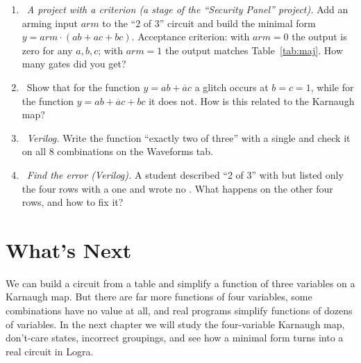 \begin{taskbox}
\begin{enumerate}
  \item {}~\emph{A project with a criterion (a stage of the ``Security Panel'' project).} Add an arming input $arm$ to the ``2 of 3'' circuit and build the minimal form $y=arm\cdot(ab+ac+bc)$. Acceptance criterion: with $arm=0$ the output is zero for any $a,b,c$; with $arm=1$ the output matches Table~\ref{tab:maj}. How many gates did you get?
  \item {}~Show that for the function $y=ab+\overline{a}c$ a glitch occurs at $b=c=1$, while for the function $y=ab+\overline{a}c+bc$ it does not. How is this related to the Karnaugh map?
  \item {}~\emph{Verilog.} Write the function ``exactly two of three'' with a single  and check it on all 8 combinations on the Waveforms tab.
  \item {}~\emph{Find the error (Verilog).} A student described ``2 of 3'' with  but listed only the four rows with a one and wrote no . What happens on the other four rows, and how to fix it?
\end{enumerate}
\end{taskbox}

\section{What's Next}

We can build a circuit from a table and simplify a function of three
variables on a Karnaugh map. But there are far more functions of four
variables, some combinations have no value at all, and real programs simplify
functions of dozens of variables. In the next chapter we will study the
four-variable Karnaugh map, don't-care states, incorrect groupings, and see
how a minimal form turns into a real circuit in Logra.
